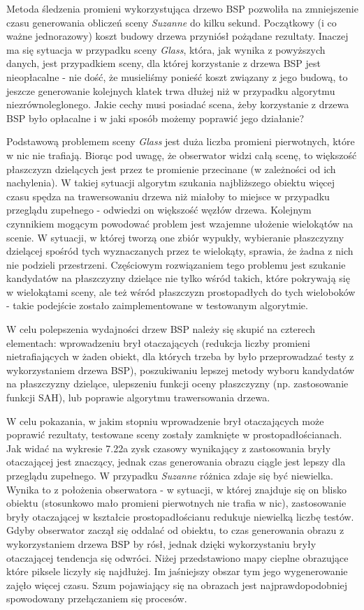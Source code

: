 Metoda śledzenia promieni wykorzystująca drzewo BSP pozwoliła na zmniejszenie czasu generowania obliczeń sceny \emph{Suzanne} do kilku sekund. Początkowy (i co ważne jednorazowy) koszt budowy drzewa przyniósł pożądane rezultaty. Inaczej ma się sytuacja w przypadku sceny \emph{Glass}, która, jak wynika z powyższych danych, jest przypadkiem sceny, dla której korzystanie z drzewa BSP jest nieopłacalne - nie dość, że musieliśmy ponieść koszt związany z jego budową, to jeszcze generowanie kolejnych klatek trwa dłużej niż w przypadku algorytmu niezrównoleglonego. Jakie cechy musi posiadać scena, żeby korzystanie z drzewa BSP było opłacalne i w jaki sposób możemy poprawić jego działanie?

Podstawową problemem sceny \emph{Glass} jest duża liczba promieni pierwotnych, które w nic nie trafiają. Biorąc pod uwagę, że obserwator widzi całą scenę, to większość płaszczyzn dzielących jest przez te promienie przecinane (w zależności od ich nachylenia). W takiej sytuacji algorytm szukania najbliższego obiektu więcej czasu spędza na trawersowaniu drzewa niż miałoby to miejsce w przypadku przeglądu zupełnego - odwiedzi on większość węzłów drzewa. Kolejnym czynnikiem mogącym powodować problem jest wzajemne ułożenie wielokątów na scenie. W sytuacji, w której tworzą one zbiór wypukły, wybieranie płaszczyzny dzielącej spośród tych wyznaczanych przez te wielokąty, sprawia, że żadna z nich nie podzieli przestrzeni. Częściowym rozwiązaniem tego problemu jest szukanie kandydatów na płaszczyzny dzielące nie tylko wśród takich, które pokrywają się w wielokątami sceny, ale też wśród płaszczyzn prostopadłych do tych wieloboków - takie podejście zostało zaimplementowane w testowanym algorytmie.

W celu polepszenia wydajności drzew BSP należy się skupić na czterech elementach: wprowadzeniu brył otaczających (redukcja liczby promieni nietrafiających w żaden obiekt, dla których trzeba by było przeprowadzać testy z wykorzystaniem drzewa BSP), poszukiwaniu lepszej metody wyboru kandydatów na płaszczyzny dzielące, ulepszeniu funkcji oceny płaszczyzny (np. zastosowanie funkcji SAH), lub poprawie algorytmu trawersowania drzewa.

W celu pokazania, w jakim stopniu wprowadzenie brył otaczających może poprawić rezultaty, testowane sceny zostały zamknięte w prostopadłościanach. Jak widać na wykresie 7.22a zysk czasowy wynikający z zastosowania bryły otaczającej jest znaczący, jednak czas generowania obrazu ciągle jest lepszy dla przeglądu zupełnego. W przypadku \emph{Suzanne} różnica zdaje się być niewielka. Wynika to z położenia obserwatora - w sytuacji, w której znajduje się on blisko obiektu (stosunkowo mało promieni pierwotnych nie trafia w nic), zastosowanie bryły otaczającej w kształcie prostopadłościanu redukuje niewielką liczbę testów. Gdyby obserwator zaczął się oddalać od obiektu, to czas generowania obrazu z wykorzystaniem drzewa BSP by rósł, jednak dzięki wykorzystaniu bryły otaczającej tendencja się odwróci. Niżej przedstawiono mapy cieplne obrazujące które piksele liczyły się najdłużej. Im jaśniejszy obszar tym jego wygenerowanie zajęło więcej czasu. Szum pojawiający się na obrazach jest najprawdopodobniej spowodowany przełączaniem się procesów.

